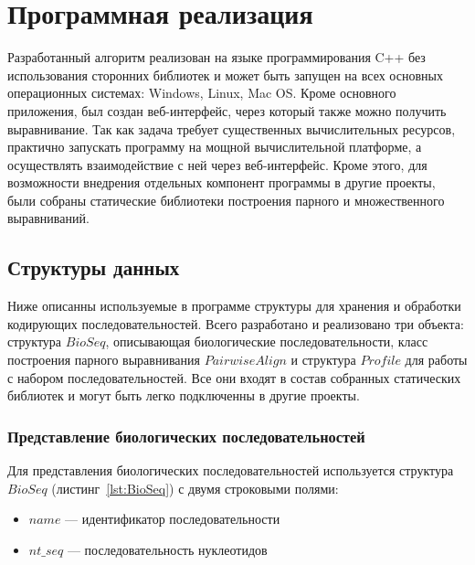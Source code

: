 \newpage

\section[Программная реализация]{\large \centering Программная реализация}
\hspace{\parindent} Разработанный алгоритм реализован на языке программирования C++ без использования сторонних библиотек и может быть запущен на всех основных операционных системах: Windows, Linux, Mac OS. Кроме основного приложения, был создан веб-интерфейс, через который также можно получить выравнивание. Так как задача требует существенных вычислительных ресурсов, практично запускать программу на мощной вычислительной платформе, а осуществлять взаимодействие с ней через веб-интерфейс. Кроме этого, для возможности внедрения отдельных компонент программы в другие проекты, были собраны статические библиотеки построения парного и множественного выравниваний.

\subsection[Структуры данных]{\large Структуры данных}
\hspace{\parindent} Ниже описанны используемые в программе структуры для хранения и обработки кодирующих последовательностей. Всего разработано и реализовано три объекта: структура $BioSeq$, описывающая биологические последовательности, класс построения парного выравнивания $PairwiseAlign$ и структура $Profile$ для работы с набором последовательностей. Все они входят в состав собранных статических библиотек и могут быть легко подключенны в другие проекты.

\subsubsection[Представление биологических последовательностей]{\large Представление биологических последовательностей}
\hspace{\parindent} Для представления биологических последовательностей используется структура $BioSeq$ (листинг~\ref{lst:BioSeq}) с двумя строковыми полями:
\begin{itemize}
	\item $name$ --- идентификатор последовательности
	\item $nt\_seq$ --- последовательность нуклеотидов
\end{itemize}

